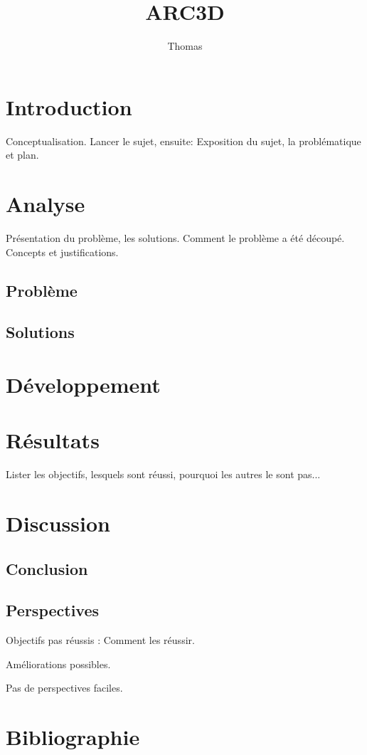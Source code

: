 \documentclass[a4paper,notitlepage]{report}
\author{Thomas \bsc{Roulin}}
\title{ARC3D}
\begin{document}
\maketitle
\clearpage

\vspace*{\fill}

\vspace*{\fill}

\tableofcontents

\chapter{Introduction}
Conceptualisation.
Lancer le sujet, ensuite:
Exposition du sujet, la problématique et plan.


\chapter{Analyse}
Présentation du problème, les solutions. Comment le problème a été découpé.
Concepts et justifications.
\section{Problème}
\section{Solutions}

\chapter{Développement}







\chapter{Résultats}
Lister les objectifs, lesquels sont réussi, pourquoi les autres le sont pas...

\chapter{Discussion}
\section{Conclusion}
\section{Perspectives}
Objectifs pas réussis : Comment les réussir.

Améliorations possibles.

Pas de perspectives faciles.


\chapter{Bibliographie}
\end{document}
